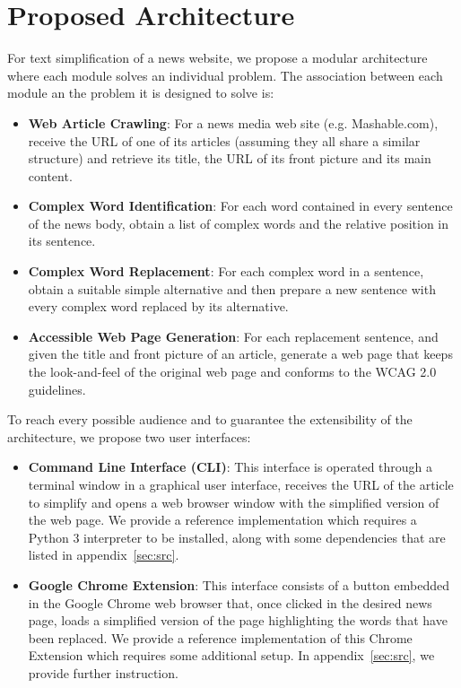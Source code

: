 \documentclass[11pt,a4paper]{article}
\begin{document}
\section{Proposed Architecture}

For text simplification of a news website, we propose a modular architecture where each module solves an individual problem. The association between each module an the problem it is designed to solve is:

\begin{itemize}
	\item{\textbf{Web Article Crawling}: For a news media web site (e.g. Mashable.com), receive the URL of one of its articles (assuming they all share a similar structure) and retrieve its title, the URL of its front picture and its main content.}
	\item{\textbf{Complex Word Identification}: For each word contained in every sentence of the news body, obtain a list of complex words and the relative position in its sentence.}
	\item{\textbf{Complex Word Replacement}: For each complex word in a sentence, obtain a suitable simple alternative and then prepare a new sentence with every complex word replaced by its alternative.}
	\item{\textbf{Accessible Web Page Generation}: For each replacement sentence, and given the title and front picture of an article, generate a web page that keeps the look-and-feel of the original web page and conforms to the WCAG 2.0~\cite{caldwell2008web} guidelines.}
\end{itemize}

To reach every possible audience and to guarantee the extensibility of the architecture, we propose two user interfaces:

\begin{itemize}
	\item{\textbf{Command Line Interface (CLI)}: This interface is operated through a terminal window in a graphical user interface, receives the URL of the article to simplify and opens a web browser window with the simplified version of the web page. We provide a reference implementation which requires a Python 3 interpreter to be installed, along with some dependencies that are listed in appendix~\ref{sec:src}}.
	\item{\textbf{Google Chrome Extension}: This interface consists of a button embedded in the Google Chrome web browser that, once clicked in the desired news page, loads a simplified version of the page highlighting the words that have been replaced. We provide a reference implementation of this Chrome Extension which requires some additional setup. In appendix~\ref{sec:src}, we provide further instruction.}
\end{itemize}
\end{document}
